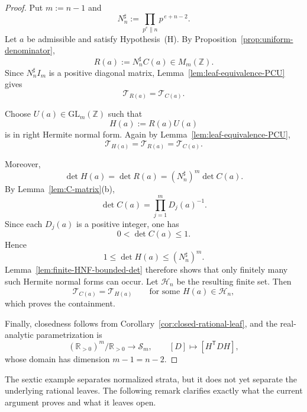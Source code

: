\documentclass[11pt,letterpaper]{amsart}
\newcommand{\Z}{\mathbb{Z}}
\newcommand{\R}{\mathbb{R}}
\newcommand{\GL}{\mathrm{GL}}
\theoremstyle{plain}
\theoremstyle{definition}
\begin{document}
\begin{proof}
Put \(m:=n-1\) and
\[
N_n^\sharp:=\prod_{p^e\parallel n} p^{\,e+n-2}.
\]
Let \(a\) be admissible and satisfy Hypothesis~\textup{(H)}.
By Proposition~\ref{prop:uniform-denominator},
\[
R(a):=N_n^\sharp C(a)\in M_m(\Z).
\]
Since \(N_n^\sharp I_m\) is a positive diagonal matrix,
Lemma~\ref{lem:leaf-equivalence-PCU} gives
\[
\mathcal T_{R(a)}=\mathcal T_{C(a)}.
\]

Choose \(U(a)\in \GL_m(\Z)\) such that
\[
H(a):=R(a)U(a)
\]
is in right Hermite normal form. Again by
Lemma~\ref{lem:leaf-equivalence-PCU},
\[
\mathcal T_{H(a)}=\mathcal T_{R(a)}=\mathcal T_{C(a)}.
\]

Moreover,
\[
\det H(a)=\det R(a)=(N_n^\sharp)^m\det C(a).
\]
By Lemma~\ref{lem:C-matrix}\textup{(b)},
\[
\det C(a)=\prod_{j=1}^m D_j(a)^{-1}.
\]
Since each \(D_j(a)\) is a positive integer, one has
\[
0<\det C(a)\le 1.
\]
Hence
\[
1\le \det H(a)\le (N_n^\sharp)^m.
\]
Lemma~\ref{lem:finite-HNF-bounded-det} therefore shows that only finitely many
such Hermite normal forms can occur. Let \(\mathcal H_n\) be the resulting
finite set. Then
\[
\mathcal T_{C(a)}=\mathcal T_{H(a)}
\qquad\text{for some }H(a)\in \mathcal H_n,
\]
which proves the containment.

Finally, closedness follows from Corollary~\ref{cor:closed-rational-leaf}, and
the real-analytic parametrization is
\[
(\R_{>0})^m/\R_{>0}\longrightarrow \mathscr S_m,
\qquad
[D]\longmapsto [H^{\mathsf T}DH],
\]
whose domain has dimension \(m-1=n-2\).
\end{proof}

The sextic example separates normalized strata, but it does not yet separate the underlying rational leaves. The following remark clarifies exactly what the current argument proves and what it leaves open.
\end{document}
